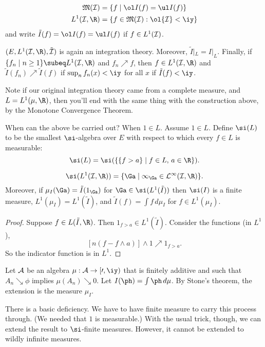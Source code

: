 \begin{align*}
\mathfrak M(\cal I)&=\{f\mid \ol I(f)=\ul I(f)\}\\
L^1(\cal I,\R)&=\{f\in \mathfrak M(\cal I):\ol{I}<\iy\} 
\end{align*}
and write $\tilde I(f)=\ol I(f)=\ul I(f)$ if $f\in L^1(\cal I)$.
\begin{thm}
$(E, L^1(\cal I, \R), \tilde I)$ is again an integration theory. Moreover, $\tilde I|_L=I|_L$. Finally, if $\{f_n\mid n\ge 1\}\subeq L^1(\cal I,\R)$ and $f_n\nearrow f$, then $f\in L^1(\cal I,\R)$ and $\tilde I(f_n)\nearrow \tilde I(f)$ if $\sup_n f_n(x)<\iy$ for all $x$ if $\tilde I(f)<\iy$.
\end{thm}
Note if our original integration theory came from a complete measure, and $L=L^1(\mu, \R)$, then you'll end with the same thing with the construction above, by the Monotone Convergence Theorem.

When can the above be carried out? When $1\in L$. Assume $1\in L$. Define $\si(L)$ to be the smallest $\si$-algebra over $E$ with respect to which every $f\in L$ is measurable:
\[
\si(L)=\si(\{\{f>a\}\mid f\in L,\,a\in \R\}).
\]
\begin{thm}[Stone]%
\[
\si(L^1(\cal I,\R))=\{\Ga\mid 1_{\Ga}\in L^1(\cal I, \R)\}.
\]
Moreover, if $\mu_I(\Ga)=\tilde I(1_{\Ga})$ for $\Ga\in \si(L^1(\tilde I))$ then $\si(I)$ is a finite measure, $L^1(\mu_I)=L^1(\tilde I)$, and $\tilde I(f)=\int f\,d\mu_I$ for $f\in L^1(\mu_I)$.
\end{thm}
\begin{proof}
Suppose $f\in L(\tilde I,\R)$. Then $1_{f>a}\in L^1(\tilde I)$. Consider the functions (in $L^1$),
\[
[n(f-f\wedge a)]\wedge 1\nearrow 1_{f>a}.
\]
So the indicator function is in $L^1$.
\end{proof}
Let $\cal A$ be an algebra $\mu:\cal A\to [0,\iy)$ that is finitely additive and such that $A_n\searrow \phi$ implies $\mu(A_n)\searrow 0$. Let $I(\ph)=\int \ph\,d\mu$. By Stone's theorem, the extension is the measure $\mu_I$.

There is a basic deficiency. We have to have finite measure to carry this process through. (We needed that $1$ is measurable.) With the usual trick, though, we can extend the result to $\si$-finite measures. However, it cannot be extended to wildly infinite measures.

